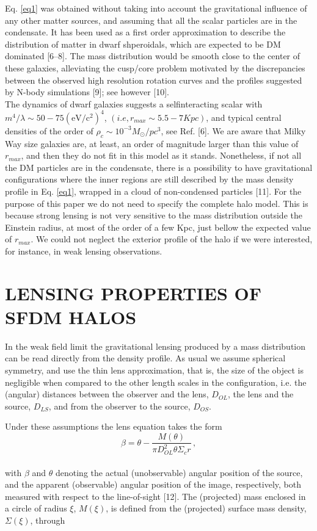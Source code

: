 \documentclass[10pt,a4paper]{article}
\begin{document}
\begin{multicols}{2}
Eq. \eqref{eq1} was obtained without taking into account the gravitational influence of any other matter sources, and assuming that all the scalar particles are in the condensate. It has been used as a first order approximation to describe the distribution of matter in dwarf shperoidals, which are expected to be DM dominated [6–8]. The mass distribution would be smooth close to the center of these
galaxies, alleviating the cusp/core problem motivated by the discrepancies between the observed high resolution rotation curves and the profiles suggested by N-body simulations [9]; see however [10]. \\

The dynamics of dwarf galaxies suggests a selfinteracting scalar with $m^4/\lambda \sim 50-75\left(\mathrm{eV}/\mathrm{c}^{2}\right)^{4}$, $(i.e, r_{max}\sim 5.5 - 7Kpc)$, and typical central densities of the order of $\rho_{c} \sim 10^{-3} M_{\odot}/pc^3$, see Ref. [6]. We are aware that Milky Way size galaxies are, at least, an order of
magnitude larger than this value of $r_{max}$, and then they
do not fit in this model as it stands. Nonetheless, if
not all the DM particles are in the condensate, there is
a possibility to have gravitational configurations where
the inner regions are still described by the mass density
profile in Eq. \eqref{eq1}, wrapped in a cloud of non-condensed
particles [11]. For the purpose of this paper we do not
need to specify the complete halo model. This is because
strong lensing is not very sensitive to the mass distribution outside the Einstein radius, at most of the order of
a few Kpc, just bellow the expected value of $r_{max}$. We
could not neglect the exterior profile of the halo if we were
interested, for instance, in weak lensing observations.


\section{LENSING PROPERTIES OF SFDM HALOS}

In the weak field limit the gravitational lensing produced by a mass distribution can be read directly from the density profile. As usual we assume spherical symmetry, and use the thin lens approximation, that is, the size of the object is negligible when compared to the other length scales in the configuration, i.e. the (angular) distances between the observer and the lens, $D_{OL}$, the lens and the source, $D_{LS}$, and from the observer to the source, $D_{OS}$.\

Under these assumptions the lens equation takes the form
\begin{equation}
\beta = \theta - \frac{M(\theta)}{\pi D_{OL}^2 \theta \Sigma_cr}\, ,
\label{eq2}
\end{equation}
\\
with $\beta$ and $\theta$ denoting the actual (unobservable) angular position of the source, and the apparent (observable) angular position of the image, respectively, both measured with respect to the line-of-sight [12]. The (projected) mass enclosed in a circle of radius $\xi$, $M(\xi)$, is defined from the (projected) surface mass density, $\Sigma(\xi)$, through


\end{multicols}
\end{document}
